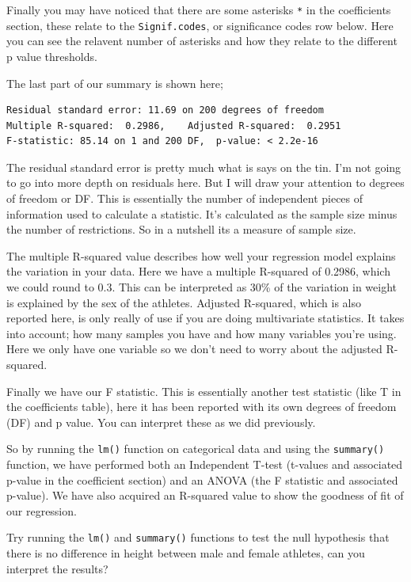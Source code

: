 \documentclass[
]{book}
\begin{document}
Finally you may have noticed that there are some asterisks \texttt{*} in the coefficients section, these relate to the \texttt{Signif.codes}, or significance codes row below. Here you can see the relavent number of asterisks and how they relate to the different p value thresholds.

The last part of our summary is shown here;

\begin{verbatim}
Residual standard error: 11.69 on 200 degrees of freedom
Multiple R-squared:  0.2986,    Adjusted R-squared:  0.2951 
F-statistic: 85.14 on 1 and 200 DF,  p-value: < 2.2e-16
\end{verbatim}

The residual standard error is pretty much what is says on the tin. I'm not going to go into more depth on residuals here. But I will draw your attention to degrees of freedom or DF. This is essentially the number of independent pieces of information used to calculate a statistic. It's calculated as the sample size minus the number of restrictions. So in a nutshell its a measure of sample size.

The multiple R-squared value describes how well your regression model explains the variation in your data. Here we have a multiple R-squared of 0.2986, which we could round to 0.3. This can be interpreted as 30\% of the variation in weight is explained by the sex of the athletes. Adjusted R-squared, which is also reported here, is only really of use if you are doing multivariate statistics. It takes into account; how many samples you have and how many variables you're using. Here we only have one variable so we don't need to worry about the adjusted R-squared.

Finally we have our F statistic. This is essentially another test statistic (like T in the coefficients table), here it has been reported with its own degrees of freedom (DF) and p value. You can interpret these as we did previously.

So by running the \texttt{lm()} function on categorical data and using the \texttt{summary()} function, we have performed both an Independent T-test (t-values and associated p-value in the coefficient section) and an ANOVA (the F statistic and associated p-value). We have also acquired an R-squared value to show the goodness of fit of our regression.

Try running the \texttt{lm()} and \texttt{summary()} functions to test the null hypothesis that there is no difference in height between male and female athletes, can you interpret the results?
\end{document}
